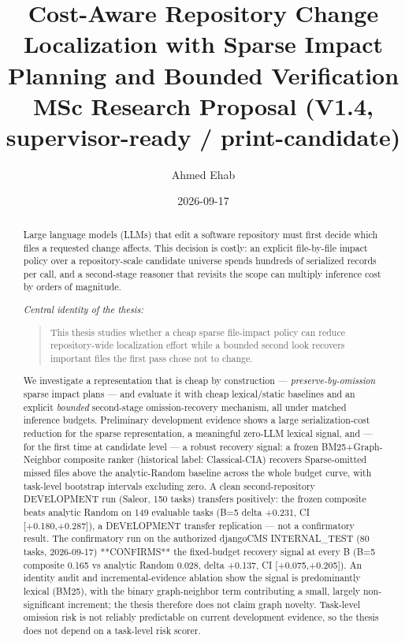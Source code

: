 \documentclass[11pt,a4paper]{article}
\title{\textbf{Cost-Aware Repository Change Localization with Sparse Impact\\[2pt]
Planning and Bounded Verification}\\[6pt]
\large MSc Research Proposal (V1.4, supervisor-ready / print-candidate)}
\author{Ahmed Ehab}
\date{2026-09-17}
\begin{document}
\maketitle

\begin{abstract}
Large language models (LLMs) that edit a software repository must first decide
which files a requested change affects. This decision is costly: an explicit
file-by-file impact policy over a repository-scale candidate universe spends
hundreds of serialized records per call, and a second-stage reasoner that
revisits the scope can multiply inference cost by orders of magnitude.

\emph{Central identity of the thesis:}

\begin{quote}
This thesis studies whether a cheap sparse file-impact policy can reduce
repository-wide localization effort while a bounded second look recovers
important files the first pass chose not to change.
\end{quote}

We investigate a representation that is cheap by construction ---
\emph{preserve-by-omission} sparse impact plans --- and evaluate it with cheap
lexical/static baselines and an explicit \emph{bounded} second-stage
omission-recovery mechanism, all under matched inference budgets. Preliminary
development evidence shows a large serialization-cost reduction for the sparse
representation, a meaningful zero-LLM lexical signal, and --- for the first
time at candidate level --- a robust recovery signal: a frozen
BM25+Graph-Neighbor composite ranker (historical label: Classical-CIA)
recovers Sparse-omitted missed files above the analytic-Random baseline across
the whole budget curve, with task-level bootstrap intervals excluding zero.
A clean second-repository DEVELOPMENT run (Saleor, 150 tasks) transfers
positively: the frozen composite beats analytic Random on 149 evaluable tasks
(B=5 delta +0.231, CI [+0.180,+0.287]), a DEVELOPMENT transfer replication ---
not a confirmatory result. The confirmatory run on the authorized djangoCMS
INTERNAL\_TEST (80 tasks, 2026-09-17) **CONFIRMS** the fixed-budget recovery
signal at every B (B=5 composite 0.165 vs analytic Random 0.028, delta +0.137,
CI [+0.075,+0.205]). An identity audit and incremental-evidence ablation
show the signal is predominantly lexical (BM25), with the binary graph-neighbor
term contributing a small, largely non-significant increment; the thesis
therefore does not claim graph novelty. Task-level omission risk is not
reliably predictable on current development evidence, so the thesis does not
depend on a task-level risk scorer.
\end{abstract}
\end{document}
